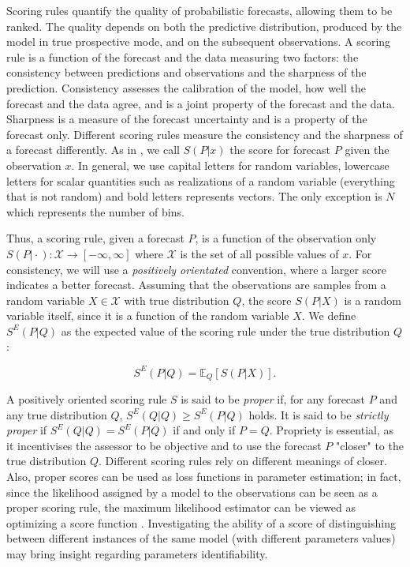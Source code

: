 \documentclass[referee,sn-basic]{sn-jnl}
\theoremstyle{thmstyleone}%
\theoremstyle{thmstyletwo}%
\theoremstyle{thmstylethree}%
\begin{document}
Scoring rules quantify the quality of probabilistic forecasts, allowing them to be ranked. The quality depends on both the predictive distribution, produced by the model in true prospective mode, and on the subsequent observations. A scoring rule is a function of the forecast and the data measuring two factors: the consistency between predictions and observations and the sharpness of the prediction. Consistency assesses the calibration of the model, how well the forecast and the data agree, and is a joint property of the forecast and the data. Sharpness is a measure of the forecast uncertainty and is a property of the forecast only.  Different scoring rules measure the consistency and the sharpness of a forecast differently.  As in \cite{gneiting2007strictly}, we call $S(P\vert  x)$ the score for forecast $P$ given the observation $x$. In general, we use capital letters for random variables, lowercase letters for scalar quantities such as realizations of a random variable  (everything that is not random) and bold letters represents vectors. The only exception is $N$ which represents the number of bins. 

Thus, a scoring rule, given a forecast $P$, is a function of the observation only $S(P \vert  \cdot):\mathcal X \rightarrow [-\infty, \infty]$ where $\mathcal X$ is the set of all possible values of $x$. For consistency, we will use a \emph{positively orientated} convention, where a larger score indicates a better forecast. Assuming that the observations are samples from a random variable $X \in \mathcal X$ with true distribution $Q$, the score $S(P\vert  X)$ is a random variable itself, since it is a function of the random variable $X$. We define $S^E(P\vert Q)$ as the expected value of the scoring rule under the true distribution $Q$:


\begin{equation}
S^E(P\vert  Q) = \mathbb E_Q[S(P\vert X)] .
\label{eq:exp_value_score}    
\end{equation}

A positively oriented scoring rule $S$ is said to be \emph{proper} if, for any forecast $P$ and any true distribution $Q$, $S^E(Q\vert Q) \geq S^E(P\vert Q)$ holds. It is said to be \emph{strictly proper} if $S^E(Q\vert Q) = S^E(P\vert Q)$ if and only if $P = Q$. Propriety is essential, as it incentivises the assessor to be objective and to use the forecast $P$ "closer" to the true distribution $Q$. Different scoring rules rely on different meanings of closer. Also, proper scores can be used as loss functions in parameter estimation; in fact, since the likelihood assigned by a model to the observations can be seen as a proper scoring rule, the maximum likelihood estimator can be viewed as optimizing a score function \citep{huber1992robust}. Investigating the ability of a score of distinguishing between different instances of the same model (with different parameters values) may bring insight regarding parameters identifiability.
\end{document}
